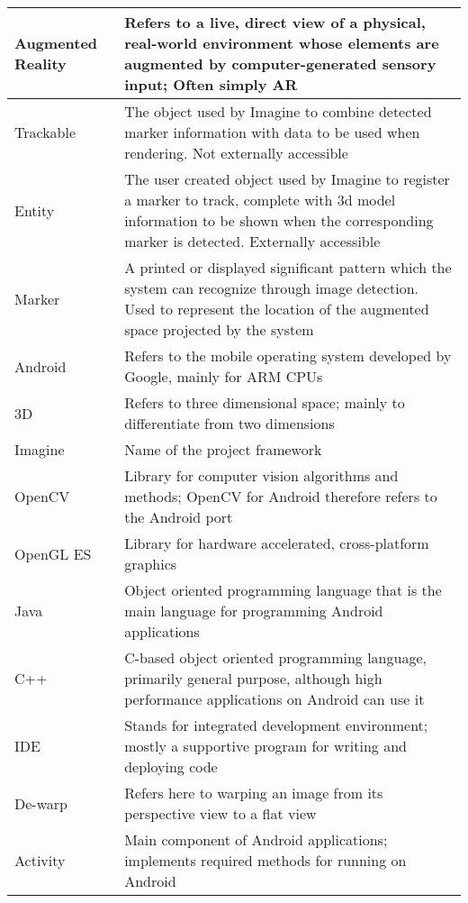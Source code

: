 
\begin{tabulary}{\textwidth}{L|L}
Augmented Reality & Refers to a live, direct view of a physical, real-world environment whose elements are augmented by computer-generated sensory input\protect \cite{ardef}; Often simply AR\\
\hline
Trackable & The object used by Imagine to combine detected marker information with data to be used when rendering. Not externally accessible\\
\hline
Entity & The user created object used by Imagine to register a marker to track, complete with 3d model information to be shown when the corresponding marker is detected. Externally accessible\\
\hline
Marker & A printed or displayed significant pattern which the system can recognize through image detection. Used to represent the location of the augmented space projected by the system \\
\hline
Android & Refers to the mobile operating system developed by Google, mainly for ARM CPUs\\
\hline
3D & Refers to three dimensional space; mainly to differentiate from two dimensions\\
\hline
Imagine & Name of the project framework\\
\hline
OpenCV & Library for computer vision algorithms and methods; OpenCV for Android therefore refers to the Android port\\
\hline
OpenGL ES & Library for hardware accelerated, cross-platform graphics\\
\hline
Java & Object oriented programming language that is the main language for programming Android applications\\
\hline
C++ & C-based object oriented programming language, primarily general purpose, although high performance applications on Android can use it\\
\hline
IDE & Stands for integrated development environment; mostly a supportive program for writing and deploying code\\
\hline
De-warp & Refers here to warping an image from its perspective view to a flat view\\
\hline
Activity & Main component of Android applications; implements required methods for running on Android\\
\end{tabulary}
